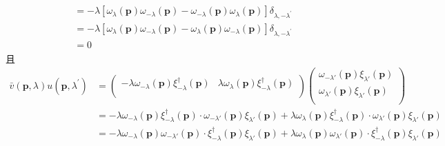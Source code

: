 \begin{equation}
\begin{aligned}
\begin{aligned}
\\
&=-\lambda \left[ \omega _{\lambda}\left( \mathbf{p} \right) \omega _{-\lambda}\left( \mathbf{p} \right) -\omega _{-\lambda}\left( \mathbf{p} \right) \omega _{\lambda}\left( \mathbf{p} \right) \right] \delta _{\lambda ,-\lambda ^{\prime}}
\\
&=-\lambda \left[ \omega _{\lambda}\left( \mathbf{p} \right) \omega _{-\lambda}\left( \mathbf{p} \right) -\omega _{\lambda}\left( \mathbf{p} \right) \omega _{-\lambda}\left( \mathbf{p} \right) \right] \delta _{\lambda ,-\lambda ^{\prime}}
\\
&=0
        \end{aligned}
    \end{aligned}
\end{equation}
且
\begin{equation}
    \begin{aligned}
        \bar{v}\left( \mathbf{p},\lambda \right) u\left( \mathbf{p},\lambda ^{\prime} \right) &=\left( \begin{matrix}
	-\lambda \omega _{-\lambda}\left( \mathbf{p} \right) \xi _{-\lambda}^{\dagger}\left( \mathbf{p} \right)&		\lambda \omega _{\lambda}\left( \mathbf{p} \right) \xi _{-\lambda}^{\dagger}\left( \mathbf{p} \right)\\
\end{matrix} \right) \left( \begin{array}{c}
	\omega _{-\lambda \prime}\left( \mathbf{p} \right) \xi _{\lambda \prime}\left( \mathbf{p} \right)\\
	\omega _{\lambda \prime}\left( \mathbf{p} \right) \xi _{\lambda \prime}\left( \mathbf{p} \right)\\
\end{array} \right) 
\\
&=-\lambda \omega _{-\lambda}\left( \mathbf{p} \right) \xi _{-\lambda}^{\dagger}\left( \mathbf{p} \right) \cdot \omega _{-\lambda \prime}\left( \mathbf{p} \right) \xi _{\lambda \prime}\left( \mathbf{p} \right) +\lambda \omega _{\lambda}\left( \mathbf{p} \right) \xi _{-\lambda}^{\dagger}\left( \mathbf{p} \right) \cdot \omega _{\lambda \prime}\left( \mathbf{p} \right) \xi _{\lambda \prime}\left( \mathbf{p} \right) 
\\
&=-\lambda \omega _{-\lambda}\left( \mathbf{p} \right) \omega _{-\lambda \prime}\left( \mathbf{p} \right) \cdot \xi _{-\lambda}^{\dagger}\left( \mathbf{p} \right) \xi _{\lambda \prime}\left( \mathbf{p} \right) +\lambda \omega _{\lambda}\left( \mathbf{p} \right) \omega _{\lambda \prime}\left( \mathbf{p} \right) \cdot \xi _{-\lambda}^{\dagger}\left( \mathbf{p} \right) \xi _{\lambda \prime}\left( \mathbf{p} \right) 

\end{aligned}
\end{equation}
